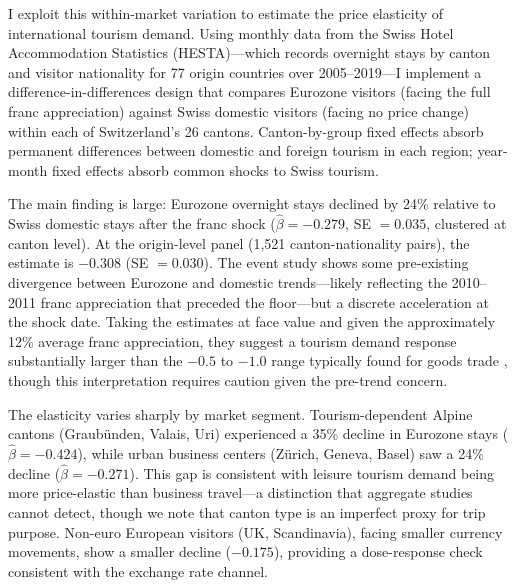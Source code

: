 \documentclass[12pt]{article}
\begin{document}
I exploit this within-market variation to estimate the price elasticity of international tourism demand. Using monthly data from the Swiss Hotel Accommodation Statistics (HESTA)---which records overnight stays by canton and visitor nationality for 77 origin countries over 2005--2019---I implement a difference-in-differences design that compares Eurozone visitors (facing the full franc appreciation) against Swiss domestic visitors (facing no price change) within each of Switzerland's 26 cantons. Canton-by-group fixed effects absorb permanent differences between domestic and foreign tourism in each region; year-month fixed effects absorb common shocks to Swiss tourism.

The main finding is large: Eurozone overnight stays declined by 24\% relative to Swiss domestic stays after the franc shock ($\hat{\beta} = -0.279$, SE $= 0.035$, clustered at canton level). At the origin-level panel (1,521 canton-nationality pairs), the estimate is $-0.308$ (SE $= 0.030$). The event study shows some pre-existing divergence between Eurozone and domestic trends---likely reflecting the 2010--2011 franc appreciation that preceded the floor---but a discrete acceleration at the shock date. Taking the estimates at face value and given the approximately 12\% average franc appreciation, they suggest a tourism demand response substantially larger than the $-0.5$ to $-1.0$ range typically found for goods trade \citep{Gopinath2010,Burstein2019}, though this interpretation requires caution given the pre-trend concern.

The elasticity varies sharply by market segment. Tourism-dependent Alpine cantons (Graubünden, Valais, Uri) experienced a 35\% decline in Eurozone stays ($\hat{\beta} = -0.424$), while urban business centers (Zürich, Geneva, Basel) saw a 24\% decline ($\hat{\beta} = -0.271$). This gap is consistent with leisure tourism demand being more price-elastic than business travel---a distinction that aggregate studies cannot detect, though we note that canton type is an imperfect proxy for trip purpose. Non-euro European visitors (UK, Scandinavia), facing smaller currency movements, show a smaller decline ($-0.175$), providing a dose-response check consistent with the exchange rate channel.
\end{document}

